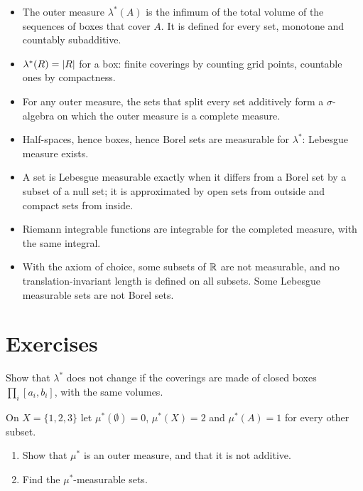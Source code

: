 \begin{notechapter}
\begin{chaptersummary}
\begin{itemize}[nosep]
  \item The outer measure $\lambda^*(A)$ is the infimum of the total
        volume of the sequences of boxes that cover $A$. It is defined
        for every set, monotone and countably subadditive.
  \item $\lambda^*(R) = \left|R\right|$ for a box: finite coverings by
        counting grid points, countable ones by compactness.
  \item For any outer measure, the sets that split every set
        additively form a $\sigma$-algebra on which the outer measure
        is a complete measure.
  \item Half-spaces, hence boxes, hence Borel sets are measurable for
        $\lambda^*$: Lebesgue measure exists.
  \item A set is Lebesgue measurable exactly when it differs from a
        Borel set by a subset of a null set; it is approximated by
        open sets from outside and compact sets from inside.
  \item Riemann integrable functions are integrable for the completed
        measure, with the same integral.
  \item With the axiom of choice, some subsets of $\mathbb{R}$ are not
        measurable, and no translation-invariant length is defined on
        all subsets. Some Lebesgue measurable sets are not Borel sets.
\end{itemize}
\end{chaptersummary}

\section*{Exercises}

\begin{exercise}\label{caratheodory:exr:1}
Show that $\lambda^*$ does not change if the coverings are made of
closed boxes $\prod_i[a_i, b_i]$, with the same volumes.
\end{exercise}

\begin{exercise}\label{caratheodory:exr:2}
On $X = \{1, 2, 3\}$ let $\mu^*(\emptyset) = 0$, $\mu^*(X) = 2$ and
$\mu^*(A) = 1$ for every other subset.
\begin{enumerate}[nosep]
  \item Show that $\mu^*$ is an outer measure, and that it is not
        additive.
  \item Find the $\mu^*$-measurable sets.
\end{enumerate}
\end{exercise}


\end{notechapter}
